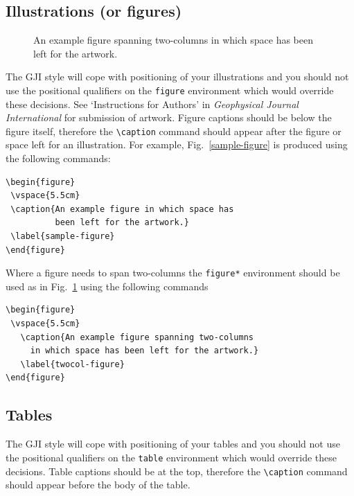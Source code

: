\documentclass{gji}
\begin{document}
\subsection{Illustrations (or figures)}

\begin{figure}
 \vspace{5.5cm}
     \caption{An example figure spanning two-columns
             in which space has been left for the artwork.}
     \label{twocol-figure}
\end{figure}

The GJI style will cope with positioning of your illustrations and
you should not use the positional qualifiers on the
\verb"figure" environment which would override these decisions. See
`Instructions for Authors' in {\em Geophysical Journal International\/}
for submission of
artwork. Figure captions should be below the figure itself, therefore
the \verb"\caption" command should appear after the figure or space
left for an illustration. For example, Fig.~\ref{sample-figure} is
produced using the following commands:
\begin{verbatim}
\begin{figure}
 \vspace{5.5cm}
 \caption{An example figure in which space has
          been left for the artwork.}
 \label{sample-figure}
\end{figure}
\end{verbatim}

Where a figure needs to span two-columns the \verb"figure*" environment
should be used as in  Fig.~\ref{twocol-figure} using the following commands
\begin{verbatim}
\begin{figure}
 \vspace{5.5cm}
   \caption{An example figure spanning two-columns
     in which space has been left for the artwork.}
   \label{twocol-figure}
\end{figure}
\end{verbatim}

\subsection{Tables}

The GJI style will cope with positioning of your tables and you
should not use the positional qualifiers on the
\verb"table" environment which would override these decisions. Table
captions should be at the top, therefore the \verb"\caption" command
should appear before the body of the table.
\end{document}
